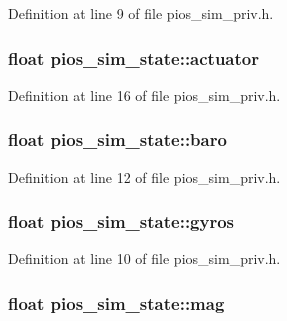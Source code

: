 Definition at line 9 of file pios\-\_\-sim\-\_\-priv.\-h.

\hypertarget{structpios__sim__state_a55774b00ece7f3e8838463f134d76c31}{
\subsubsection[{actuator}]{\setlength{\rightskip}{0pt plus 5cm}float pios\-\_\-sim\-\_\-state\-::actuator}}\label{structpios__sim__state_a55774b00ece7f3e8838463f134d76c31}


Definition at line 16 of file pios\-\_\-sim\-\_\-priv.\-h.

\hypertarget{structpios__sim__state_a94e7d90c9324c1ba57dc317f196c6cb7}{
\subsubsection[{baro}]{\setlength{\rightskip}{0pt plus 5cm}float pios\-\_\-sim\-\_\-state\-::baro}}\label{structpios__sim__state_a94e7d90c9324c1ba57dc317f196c6cb7}


Definition at line 12 of file pios\-\_\-sim\-\_\-priv.\-h.

\hypertarget{structpios__sim__state_a4f14d581cd35e88fd69e425af85cf250}{
\subsubsection[{gyros}]{\setlength{\rightskip}{0pt plus 5cm}float pios\-\_\-sim\-\_\-state\-::gyros}}\label{structpios__sim__state_a4f14d581cd35e88fd69e425af85cf250}


Definition at line 10 of file pios\-\_\-sim\-\_\-priv.\-h.

\hypertarget{structpios__sim__state_a4c78038dfaebbd96ed3705e53a6187e0}{
\subsubsection[{mag}]{\setlength{\rightskip}{0pt plus 5cm}float pios\-\_\-sim\-\_\-state\-::mag}}\label{structpios__sim__state_a4c78038dfaebbd96ed3705e53a6187e0}


